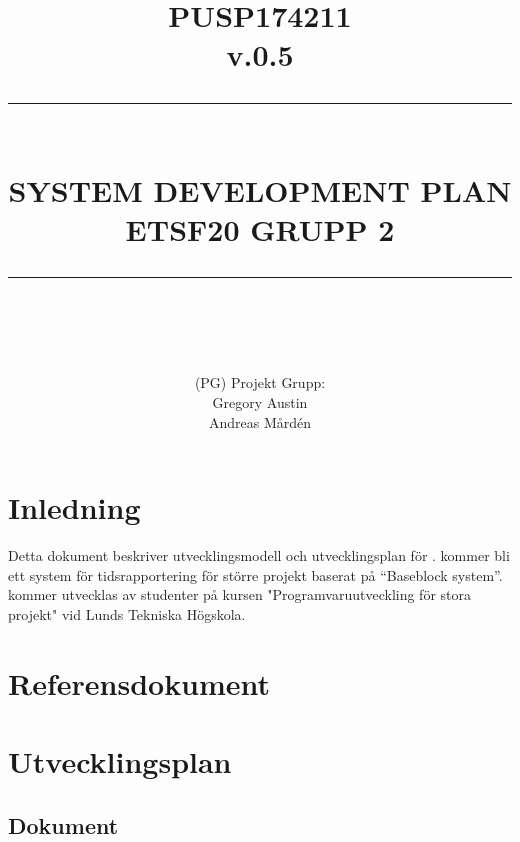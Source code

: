 \documentclass[paper=a4, fontsize=11pt,twoside]{article}
\title{ 														%
	\documentNumber{#1}											%
	\documentVersion{#2}											%
	\HRule{0.5pt} \\ %
	\LARGE \textbf{\uppercase{#3}} \\  									%
	\large \textbf{\uppercase{ETSF20 Grupp 2}}							%
	\HRule{2pt} \\ [0.5cm]      	%
	\normalsize          		%
	}															%
\author{#4}													%
\date{}                                           	%
\newcommand{\HRule}[1]{\rule{\linewidth}{#1}}   							%
\newcommand{\documentNumber}[1]{\centering PUSP1742#1 \\[1.0cm]}	 		%
\newcommand{\documentVersion}[1]{\centering \small{v.#1} \\[1.0cm]}	 		%
\newcommand{\grouptitlepage}[4]{										%
	\title{ 														%
	\documentNumber{#1}											%
	\documentVersion{#2}											%
	\HRule{0.5pt} \\ %
	\LARGE \textbf{\uppercase{#3}} \\  									%
	\large \textbf{\uppercase{ETSF20 Grupp 2}}							%
	\HRule{2pt} \\ [0.5cm]      	%
	\normalsize          		%
	}															%
	\author{#4}													%
	\maketitle														%
	\tableofcontents												%
	\thispagestyle{empty} 											%
	\newpage														%
}																%
\begin{document}
\grouptitlepage
{11}
{0.5}
{System Development Plan}
{(PG) Projekt Grupp: \\ Gregory Austin \\ Andreas Mårdén}	

\section{Inledning}
Detta dokument beskriver utvecklingsmodell och utvecklingsplan för {\color{red}{(Namn på produkt)-projektet}}. {\color{red}{(Namn på produkt)}} kommer bli ett system för tidsrapportering för större projekt baserat på ``Baseblock system''. {\color{red}{(Namn på produkt)}} kommer utvecklas av studenter på kursen "Programvaruutveckling för stora projekt" vid Lunds Tekniska Högskola.

\section{Referensdokument}
{\color{red}{BASEBLOCKSYSTEM Dokumentet}}
\section{Utvecklingsplan}

\subsection*{Dokument}
\end{document}
